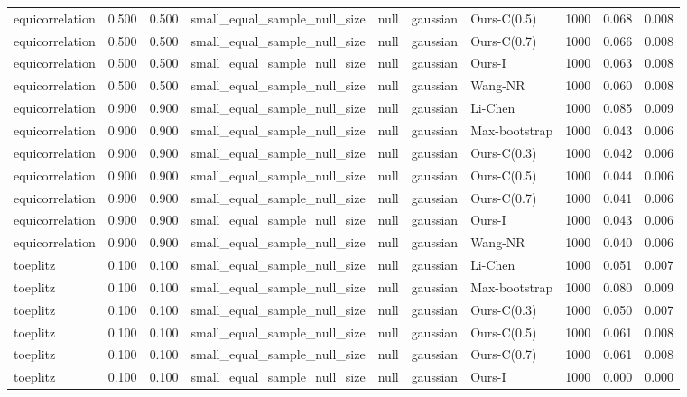 \begin{tabular}{lrrllllrrr}
equicorrelation & 0.500 & 0.500 & small\_equal\_sample\_null\_size & null & gaussian & Ours-C(0.5) & 1000 & 0.068 & 0.008 \\
equicorrelation & 0.500 & 0.500 & small\_equal\_sample\_null\_size & null & gaussian & Ours-C(0.7) & 1000 & 0.066 & 0.008 \\
equicorrelation & 0.500 & 0.500 & small\_equal\_sample\_null\_size & null & gaussian & Ours-I & 1000 & 0.063 & 0.008 \\
equicorrelation & 0.500 & 0.500 & small\_equal\_sample\_null\_size & null & gaussian & Wang-NR & 1000 & 0.060 & 0.008 \\
equicorrelation & 0.900 & 0.900 & small\_equal\_sample\_null\_size & null & gaussian & Li-Chen & 1000 & 0.085 & 0.009 \\
equicorrelation & 0.900 & 0.900 & small\_equal\_sample\_null\_size & null & gaussian & Max-bootstrap & 1000 & 0.043 & 0.006 \\
equicorrelation & 0.900 & 0.900 & small\_equal\_sample\_null\_size & null & gaussian & Ours-C(0.3) & 1000 & 0.042 & 0.006 \\
equicorrelation & 0.900 & 0.900 & small\_equal\_sample\_null\_size & null & gaussian & Ours-C(0.5) & 1000 & 0.044 & 0.006 \\
equicorrelation & 0.900 & 0.900 & small\_equal\_sample\_null\_size & null & gaussian & Ours-C(0.7) & 1000 & 0.041 & 0.006 \\
equicorrelation & 0.900 & 0.900 & small\_equal\_sample\_null\_size & null & gaussian & Ours-I & 1000 & 0.043 & 0.006 \\
equicorrelation & 0.900 & 0.900 & small\_equal\_sample\_null\_size & null & gaussian & Wang-NR & 1000 & 0.040 & 0.006 \\
toeplitz & 0.100 & 0.100 & small\_equal\_sample\_null\_size & null & gaussian & Li-Chen & 1000 & 0.051 & 0.007 \\
toeplitz & 0.100 & 0.100 & small\_equal\_sample\_null\_size & null & gaussian & Max-bootstrap & 1000 & 0.080 & 0.009 \\
toeplitz & 0.100 & 0.100 & small\_equal\_sample\_null\_size & null & gaussian & Ours-C(0.3) & 1000 & 0.050 & 0.007 \\
toeplitz & 0.100 & 0.100 & small\_equal\_sample\_null\_size & null & gaussian & Ours-C(0.5) & 1000 & 0.061 & 0.008 \\
toeplitz & 0.100 & 0.100 & small\_equal\_sample\_null\_size & null & gaussian & Ours-C(0.7) & 1000 & 0.061 & 0.008 \\
toeplitz & 0.100 & 0.100 & small\_equal\_sample\_null\_size & null & gaussian & Ours-I & 1000 & 0.000 & 0.000 \\

\end{tabular}
